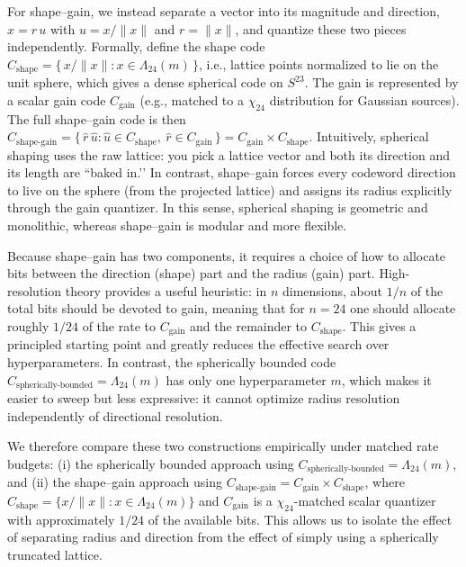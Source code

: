 \documentclass{article}
\theoremstyle{plain}
\theoremstyle{definition}
\theoremstyle{remark}
\begin{document}
For shape–gain, we instead separate a vector into its magnitude and direction, \(x = r\,u\) with \(u = x/\|x\|\) and \(r=\|x\|\), and quantize these two pieces independently. Formally, define the shape code \(C_{\text{shape}} = \{\, x/\|x\| : x \in \Lambda_{24}(m)\,\}\), i.e., lattice points normalized to lie on the unit sphere, which gives a dense spherical code on \(S^{23}\). The gain is represented by a scalar gain code \(C_{\text{gain}}\) (e.g., matched to a \(\chi_{24}\) distribution for Gaussian sources). The full shape–gain code is then \(C_{\text{shape-gain}} = \{\, \hat r\, \hat u : \hat u \in C_{\text{shape}},\ \hat r \in C_{\text{gain}}\,\} = C_{\text{gain}} \times C_{\text{shape}}\). Intuitively, spherical shaping uses the raw lattice: you pick a lattice vector and both its direction and its length are “baked in.’’ In contrast, shape–gain forces every codeword direction to live on the sphere (from the projected lattice) and assigns its radius explicitly through the gain quantizer. In this sense, spherical shaping is geometric and monolithic, whereas shape–gain is modular and more flexible.

Because shape–gain has two components, it requires a choice of how to allocate bits between the direction (shape) part and the radius (gain) part. High-resolution theory provides a useful heuristic: in \(n\) dimensions, about \(1/n\) of the total bits should be devoted to gain, meaning that for \(n=24\) one should allocate roughly \(1/24\) of the rate to \(C_{\text{gain}}\) and the remainder to \(C_{\text{shape}}\). This gives a principled starting point and greatly reduces the effective search over hyperparameters. In contrast, the spherically bounded code \(C_{\text{spherically-bounded}} = \Lambda_{24}(m)\) has only one hyperparameter \(m\), which makes it easier to sweep but less expressive: it cannot optimize radius resolution independently of directional resolution.

We therefore compare these two constructions empirically under matched rate budgets: (i) the spherically bounded approach using \(C_{\text{spherically-bounded}} = \Lambda_{24}(m)\), and (ii) the shape–gain approach using \(C_{\text{shape-gain}} = C_{\text{gain}} \times C_{\text{shape}}\), where \(C_{\text{shape}} = \{x/\|x\| : x \in \Lambda_{24}(m)\}\) and \(C_{\text{gain}}\) is a \(\chi_{24}\)-matched scalar quantizer with approximately \(1/24\) of the available bits. This allows us to isolate the effect of separating radius and direction from the effect of simply using a spherically truncated lattice. 
\end{document}
